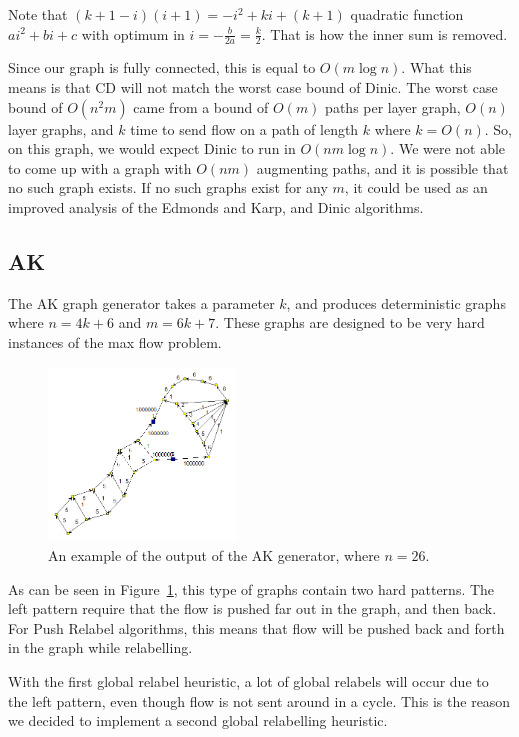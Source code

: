 Note that $(k+1-i)(i+1)=-i^2+ki+(k+1)$ quadratic function $ai^2+bi+c$ with optimum in $i=-\frac{b}{2a}=\frac{k}{2}$. 
That is how the inner sum is removed.

Since our graph is fully connected, this is equal to $O(m\log n)$.
What this means is that CD will not match the worst case bound of Dinic. 
The worst case bound of $O(n^2m)$ came from a bound of $O(m)$ paths per layer graph, $O(n)$ layer graphs, and $k$ time to send flow on a path of length $k$ where $k=O(n)$.
So, on this graph, we would expect Dinic to run in $O(nm\log n)$.
We were not able to come up with a graph with $O(nm)$ augmenting paths, and it is possible that no such graph exists.
If no such graphs exist for any $m$, it could be used as an improved analysis of the Edmonds and Karp, and Dinic algorithms. 

\subsection{AK}
\label{AKGraphSection}
The AK graph generator takes a parameter $k$, and produces deterministic graphs where $n=4k+6$ and $m=6k+7$. 
These graphs are designed to be very hard instances of the max flow problem.

\begin{figure}[!ht]
\centering
\includegraphics[width=50mm]{ak.png}
\caption{An example of the output of the AK generator, where $n=26$.}
\label{akExample}
\end{figure}

As can be seen in Figure~\ref{akExample}, this type of graphs contain two hard patterns. The left pattern require that the flow is pushed far out in the graph, and then back.
For Push Relabel algorithms, this means that flow will be pushed back and forth in the graph while relabelling. 

With the first global relabel heuristic, a lot of global relabels will occur due to the left pattern, even though flow is not sent around in a cycle. 
This is the reason we decided to implement a second global relabelling heuristic.

